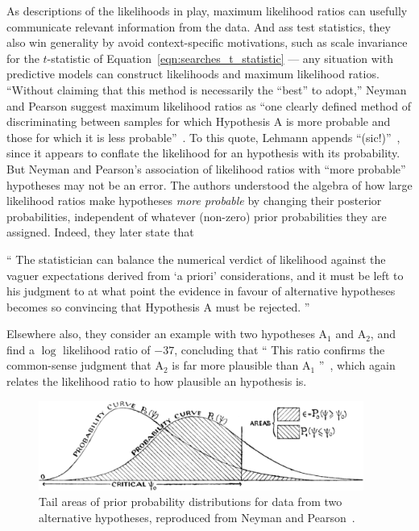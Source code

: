 As descriptions of the likelihoods in play, maximum likelihood ratios can
usefully communicate relevant information from the data.
And ass test statistics, they also win generality by avoid context-specific
motivations, such as scale invariance for the $t$-statistic of
Equation~\ref{eqn:searches_t_statistic} --- any situation with predictive
models can construct likelihoods and maximum likelihood ratios.
``Without claiming that this method is necessarily the ``best'' to adopt,''
Neyman and Pearson suggest maximum likelihood ratios as
``one clearly defined method of discriminating between samples for which
Hypothesis A is more probable and those for which it is less probable''~\cite{
neymanpearson1933lemma}.
To this quote, Lehmann appends ``(sic!)''~\cite{lehmann2011fisher}, since it
appears to conflate the likelihood for an hypothesis with its probability.
But Neyman and Pearson's association of likelihood ratios with
``more probable'' hypotheses may not be an error.
The authors understood the algebra of how large likelihood ratios make
hypotheses \emph{more probable} by changing their posterior probabilities,
independent of whatever (non-zero) prior probabilities they are assigned.
Indeed, they later state that
\begin{displayquote}
``%
The statistician can balance the numerical verdict of likelihood against the
vaguer expectations derived from `a priori' considerations, and it must be left
to his judgment to at what point the evidence in favour of alternative
hypotheses becomes so convincing that Hypothesis A must be rejected.%
''~\cite{neymanpearson1933lemma}
\end{displayquote}
Elsewhere also, they consider an example with two hypotheses $\mathrm{A}_1$
and $\mathrm{A}_2$, and find a $\log$ likelihood ratio of
$-37$, concluding that
``%
This ratio confirms the common-sense judgment that $\mathrm{A}_2$ is far more
plausible than $\mathrm{A}_1$%
''~\cite{neymanpearson1928max},
which again relates the likelihood ratio to how plausible an hypothesis is.

\begin{figure}[tp]
\centering
\includegraphics[width=0.95\textwidth]{figures/searches_np_curves_crop.png}
\caption[
Tail areas of prior probability distributions for data from two alternative
hypotheses, reproduced from Neyman and Pearson
]{%
Tail areas of prior probability distributions for data from two alternative
hypotheses, reproduced from Neyman and Pearson~\cite{neymanpearson1933lemma}.
}
\label{fig:searches_np_tails}
\end{figure}

